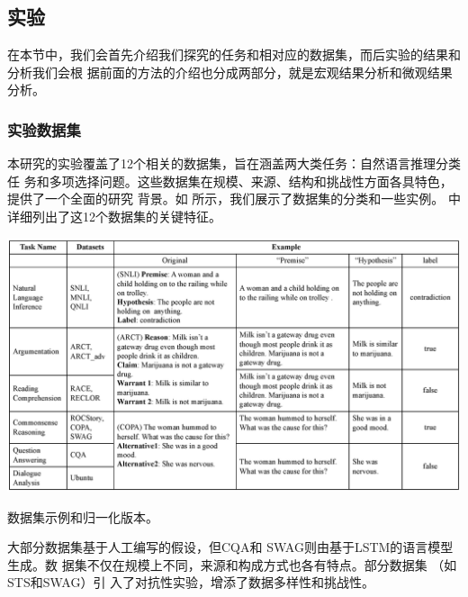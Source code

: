 \subsection{实验}
\label{sec4:experiment}
在本节中，我们会首先介绍我们探究的任务和相对应的数据集，而后实验的结果和分析我们会根
据前面的方法的介绍也分成两部分，就是宏观结果分析和微观结果分析。
\subsubsection{实验数据集}

本研究的实验覆盖了12个相关的数据集，旨在涵盖两大类任务：自然语言推理分类任
务和多项选择问题。这些数据集在规模、来源、结构和挑战性方面各具特色，提供了一个全面的研究
背景。如 所示，我们展示了数据集的分类和一些实例。
 中详细列出了这12个数据集的关键特征。

\begin{table}[th]
\centering
\includegraphics[width=\columnwidth]{figures/iconip/datasets_exp.eps}
\caption{数据集示例和归一化版本。}
\label{tab4:datasets_exp}
\end{table}

大部分数据集基于人工编写的假设，但CQA\cite{talmor2019commonsenseqa}和
SWAG\cite{zellers2018swag}则由基于LSTM的语言模型生成。数
据集不仅在规模上不同，来源和构成方式也各有特点。部分数据集
（如STS\cite{schuster2019towards}和SWAG）引
入了对抗性实验，增添了数据多样性和挑战性。

